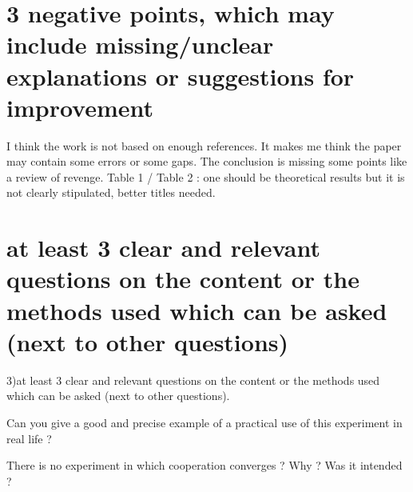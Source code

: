 \documentclass{article}
\begin{document}
\section{3 negative points, which may include missing/unclear explanations or suggestions for improvement}

I think the work is not based on enough references. It makes me think the paper may contain some errors or some gaps.
The conclusion is missing some points like a review of revenge.
Table 1 / Table 2 : one should be theoretical results but it is not clearly stipulated, better titles needed.


\section{at least 3 clear and relevant questions on the content or the methods used which can be asked (next to other questions)}

3)at least 3 clear and relevant questions on the content or the methods used which can be asked (next to other questions). 

Can you give a good and precise example of a practical use of this experiment in real life ? 

There is no experiment in which cooperation converges ? Why ? Was it intended ? 
\end{document}
